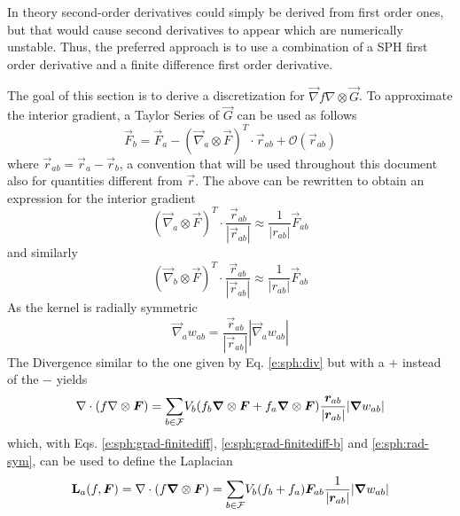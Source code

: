 In theory second-order derivatives could simply be derived from first
order ones, but that would cause second derivatives to appear which are
numerically unstable. Thus, the preferred approach is to use a
combination of a SPH first order derivative and a finite difference
first order derivative.

The goal of this section is to derive a discretization for $\vec{\nabla} f
\nabla \otimes \vec{G}$. To approximate the interior gradient, a
Taylor Series of $\vec{G}$ can be used as follows
\begin{equation}
\vec{F}_b = \vec{F}_a - (\vec{\nabla}_a \otimes \vec{F})^T \cdot
\vec{r}_{ab} + \mathcal{O}(\vec{r}_{ab})
\label{e:sph:taylor}
\end{equation}
where $\vec{r}_{ab} = \vec{r}_a - \vec{r}_b$, a convention that will
be used throughout this document also for quantities different from
$\vec{r}$.
The above can be rewritten to obtain an expression for the interior
gradient
\begin{equation}
(\vec{\nabla}_a \otimes \vec{F})^T \cdot
\frac{\vec{r}_{ab}}{|\vec{r}_{ab}|} \approx
\frac{1}{|r_{ab}|}\vec{F}_{ab}
\label{e:sph:grad-finitediff}
\end{equation}
and similarly
\begin{equation}
(\vec{\nabla}_b \otimes \vec{F})^T \cdot
\frac{\vec{r}_{ab}}{|\vec{r}_{ab}|} \approx
\frac{1}{|r_{ab}|}\vec{F}_{ab}
\label{e:sph:grad-finitediff-b}
\end{equation}
As the kernel is radially symmetric
\begin{equation}
\vec{\nabla}_a w_{ab} = \frac{\vec{r}_{ab}}{|\vec{r}_{ab}|} |\vec{\nabla}_a
w_{ab}|
\label{e:sph:rad-sym}
\end{equation}
The Divergence similar to the one given by Eq.
\eqref{e:sph:div} but with a $+$ instead of the $-$ yields
\begin{equation}
\nabla \cdot (f \nabla \otimes \bm{F}) = \underset{b \in \mathcal{F}}{\sum} V_b (f_b \bm{\nabla}
\otimes \bm{F} + f_a \bm{\nabla} \otimes \bm{F})
\frac{\bm{r}_{ab}}{|\bm{r}_{ab}|} |\bm{\nabla} w_{ab}|
\end{equation}
which, with Eqs. \eqref{e:sph:grad-finitediff},
\eqref{e:sph:grad-finitediff-b} and \eqref{e:sph:rad-sym}, can be used to
define the Laplacian
\begin{equation}
\textbf{L}_a(f, \bm{F}) = \nabla \cdot (f \bm{\nabla} \otimes \bm{F}) = \underset{b \in \mathcal{F}}{\sum}
V_b (f_b + f_a) \bm{F}_{ab} \frac{1}{|\bm{r}_{ab}|} |\bm{\nabla} w_{ab}|
\label{e:sph:lap}
\end{equation}

